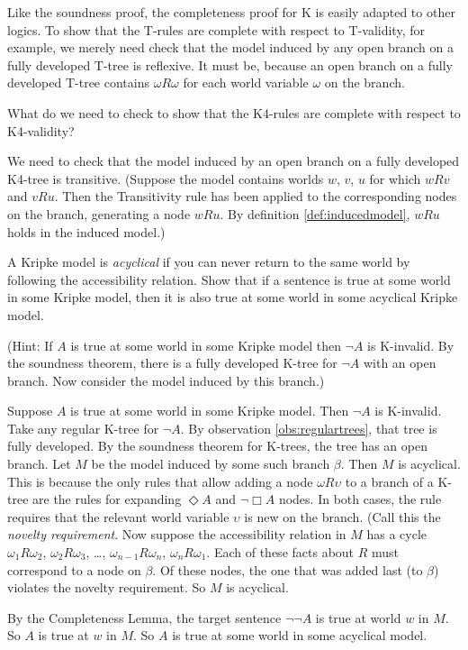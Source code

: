 Like the soundness proof, the completeness proof for K is easily adapted to
other logics. To show that the T-rules are complete with respect to T-validity,
for example, we merely need check that the model induced by any open branch on a
fully developed T-tree is reflexive. It must be, because an open branch on a
fully developed T-tree contains $\omega R \omega$ for each world variable
$\omega$ on the branch.


\begin{exercise}
  What do we need to check to show that the K4-rules are complete with respect
  to K4-validity?
\end{exercise}
\begin{solution}
  We need to check that the model induced by an open branch on a fully developed
  K4-tree is transitive. (Suppose the model contains worlds $w$, $v$, $u$ for
  which $wRv$ and $vRu$. Then the Transitivity rule has been applied to the
  corresponding nodes on the branch, generating a node $wRu$. By definition
  \ref{def:inducedmodel}, $wRu$ holds in the induced model.)
\end{solution}

\begin{exercise}\label{ex:acyclical}
  A Kripke model is \emph{acyclical} if you can never return to the same world
  by following the accessibility relation. Show that if a sentence is true at
  some world in some Kripke model, then it is also true at some world in some
  acyclical Kripke model.

  (Hint: If $A$ is true at some world in some Kripke model then $\neg A$ is
  K-invalid. By the soundness theorem, there is a fully developed K-tree for
  $\neg A$ with an open branch. Now consider the model induced by this branch.)
\end{exercise}
\begin{solution}
  Suppose $A$ is true at some world in some Kripke model. Then $\neg A$ is
  K-invalid. Take any regular K-tree for $\neg A$. By observation
  \ref{obs:regulartrees}, that tree is fully developed. By the soundness theorem
  for K-trees, the tree has an open branch. Let $M$ be the model induced by some
  such branch $\beta$. Then $M$ is acyclical. This is because the only rules
  that allow adding a node $\omega R \upsilon$ to a branch of a K-tree are the
  rules for expanding $\Diamond A$ and $\neg\Box A$ nodes. In both cases, the
  rule requires that the relevant world variable $\upsilon$ is new on the
  branch. (Call this the \emph{novelty requirement}. Now suppose the
  accessibility relation in $M$ has a cycle $\omega_{1} R \omega_{2}$,
  $\omega_{2} R \omega_{3}$, \ldots, $\omega_{n-1} R \omega_{n}$,
  $\omega_{n} R \omega_{1}$. Each of these facts about $R$ must correspond to a
  node on $\beta$. Of these nodes, the one that was added last (to $\beta$)
  violates the novelty requirement. So $M$ is acyclical.

  By the Completeness Lemma, the target sentence $\neg\neg A$ is true at world
  $w$ in $M$. So $A$ is true at $w$ in $M$. So $A$ is true at some world in some acyclical model.
\end{solution}

